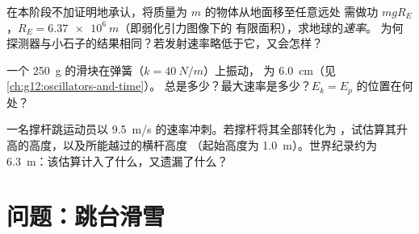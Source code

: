 \begin{exercise}[$\star\star\star$]\label{exo:g12:work-and-energy:13}
在本阶段不加证明地承认，将质量为 $m$ 的物体从地面移至任意远处
需做功 $mgR_E$，$R_E = \qty{6.37e6}{m}$（即弱化引力图像下的
有限面积），求地球的\emph{速率}。
为何探测器与小石子的结果相同？若发射速率略低于它，又会怎样？
\end{exercise}

\begin{exercise}[$\star\star\star$]\label{exo:g12:work-and-energy:14}
一个 \qty{250}{g} 的滑块在弹簧（$k = \qty{40}{N/m}$）上振动，
为 \qty{6.0}{cm}（见\cref{ch:g12:oscillators-and-time}）。
总是多少？最大速率是多少？$E_k = E_p$ 的位置在何处？
\end{exercise}

\begin{exercise}[$\star\star\star$]\label{exo:g12:work-and-energy:15}
一名撑杆跳运动员以 \qty{9.5}{m/s} 的速率冲刺。若撑杆将其全部转化为
，试估算其升高的高度，以及所能越过的横杆高度
（起始高度为 \qty{1.0}{m}）。世界纪录约为
\qty{6.3}{m}：该估算计入了什么，又遗漏了什么？
\end{exercise}

\section{问题：跳台滑雪}

